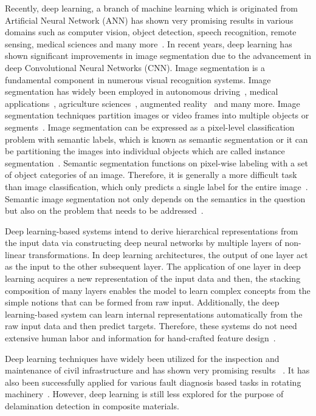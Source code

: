Recently, deep learning, a branch of machine learning which is originated from Artificial Neural Network (ANN) has shown very promising results in various domains such as computer vision, object detection, speech recognition, remote sensing, medical sciences and many more~\cite{deng2014deep, mohanty2016using, zhang2020well, pashaei2020review}. In recent years, deep learning has shown significant improvements in image segmentation due to the advancement in deep Convolutional Neural Networks (CNN). Image segmentation is a fundamental component in numerous visual recognition systems. Image segmentation has widely been employed in autonomous driving~\cite{zhang2013understanding, cordts2016cityscapes, ros2016synthia, li2018real}, medical applications~\cite{taghanaki2020deep}, agriculture sciences~\cite{milioto2018real}, augmented reality~\cite{miksik2015semantic} and many more. Image segmentation techniques partition images or video frames into multiple objects or segments~\cite{szeliski2010computer}. Image segmentation can be expressed as a pixel-level classification problem with semantic labels, which is known as semantic segmentation or it can be partitioning the images into individual objects which are called instance segmentation~\cite{minaee2020image}. Semantic segmentation functions on pixel-wise labeling with a set of object categories of an image. Therefore, it is generally a more difficult task than image classification, which only predicts a single label for the entire image~\cite{minaee2020image}. Semantic image segmentation not only depends on the semantics in the question but also on the problem that needs to be addressed~\cite{ghosh2019understanding}.

Deep learning-based systems intend to derive hierarchical representations from the input data via constructing deep neural networks by multiple layers of non-linear transformations. In deep learning architectures, the output of one layer act as the input to the other subsequent layer. The application of one layer in deep learning acquires a new representation of the input data and then, the stacking composition of many layers enables the model to learn complex concepts from the simple notions that can be formed from raw input. Additionally, the deep learning-based system can learn internal representations automatically from the raw input data and then predict targets. Therefore, these systems do not need extensive human labor and information for hand-crafted feature design~\cite{zhao2019deep, yuan2020machine}.

Deep learning techniques have widely been utilized for the inspection and maintenance of civil infrastructure and has shown very promising results ~\cite{cha2017deep, lin2017structural, liu2019computer}. It has also been successfully applied for various fault diagnosis based tasks in rotating machinery~\cite{jia2016deep, janssens2016convolutional}. However, deep learning is still less explored for the purpose of delamination detection in composite materials.   

